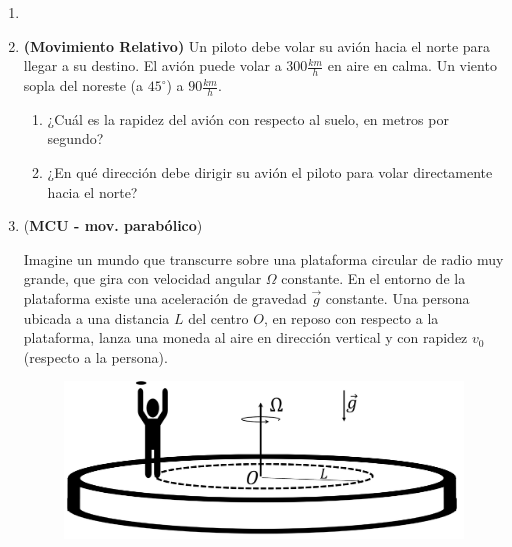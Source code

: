 \documentclass[letterpaper,11pt]{article}
\begin{document}
\vspace{-1cm}
\begin{enumerate}\setlength{\itemsep}{0.4cm}\addtocounter{enumi}{-0}


\item[]

\item \textbf{(Movimiento Relativo)} Un piloto debe volar su avión hacia el norte para llegar a su destino. El avión puede volar a $300 \frac{km}{h}$ en aire en calma. Un viento sopla del noreste (a $45^\circ$) a $90 \frac{km}{h}$.

\begin{enumerate}
    \item ¿Cuál es la rapidez del avión con respecto al suelo, en metros por segundo?
    
    \item ¿En qué dirección debe dirigir su avión el piloto para volar directamente hacia el norte?
    
\end{enumerate}

\item (\textbf{MCU - mov. parabólico})

\begin{multicols}{2}
     Imagine un mundo que transcurre sobre una plataforma circular de radio muy grande, que gira con velocidad angular $\Omega$ constante. En el entorno de la plataforma existe una aceleración de gravedad $\vec{g}$ constante. Una persona ubicada a una distancia $L$ del centro $O$, en reposo con respecto a la plataforma, lanza una moneda al aire en dirección vertical y con rapidez $v_0$ (respecto a la persona). 
    \columnbreak
    
    \begin{figure}[H]
        \centering
        \includegraphics[width = 0.8\linewidth]{2021-1/Imagenes/aux4/moneda-circulo.pdf}
    \end{figure}
\end{multicols}


\end{enumerate}
\end{document}
